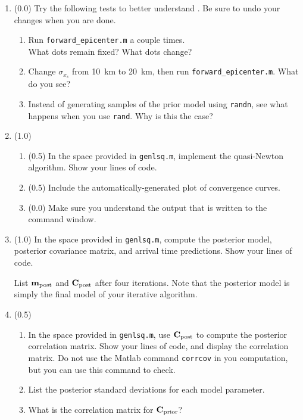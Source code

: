 \documentclass[11pt,titlepage,fleqn]{article}
\begin{document}
\begin{enumerate}

\item (0.0) Try the following tests to better understand . Be sure to undo your changes when you are done.
%
\begin{enumerate}
\item Run \verb+forward_epicenter.m+ a couple times. \\
What dots remain fixed? What dots change?

\item Change $\sigma_{x_s}$ from 10~km to 20~km, then run \verb+forward_epicenter.m+. What do you see?

\item Instead of generating samples of the prior model using \verb+randn+, see what happens when you use \verb+rand+. Why is this the case?
\end{enumerate}

\item (1.0)
%
\begin{enumerate}
\item (0.5) In the space provided in \verb+genlsq.m+, implement the quasi-Newton algorithm.
Show your lines of code.
\item (0.5) Include the automatically-generated plot of convergence curves.
\item (0.0) Make sure you understand the output that is written to the command window.
\end{enumerate}


\item (1.0) In the space provided in \verb+genlsq.m+, compute the posterior model, posterior covariance matrix, and arrival time predictions.
Show your lines of code.

List $\mbox{${\bf m}$}_{\rm post}$ and $\mbox{${\bf C}$}_{\rm post}$ after four iterations. Note that the posterior model is simply the final model of your iterative algorithm.


\item (0.5) 
\begin{enumerate}
\item In the space provided in \verb+genlsq.m+, use $\mbox{${\bf C}$}_{\rm post}$ to compute the posterior correlation matrix. Show your lines of code, and display the correlation matrix. Do not use the Matlab command \verb+corrcov+ in you computation, but you can use this command to check.

\item List the posterior standard deviations for each model parameter.

\item What is the correlation matrix for $\mbox{${\bf C}$}_{\rm prior}$?
\end{enumerate}

\end{enumerate}
\end{document}
